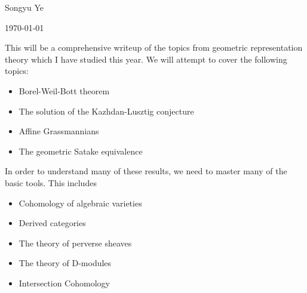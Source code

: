 \documentclass[12pt]{article}
\begin{document}
Songyu Ye

\today

\hfill

This will be a comprehensive writeup of the topics from geometric representation theory which I have studied this year.
We will attempt to cover the following topics:
\begin{itemize}
    \item Borel-Weil-Bott theorem
    \item The solution of the Kazhdan-Lusztig conjecture
    \item Affine Grassmannians
    \item The geometric Satake equivalence
\end{itemize}
In order to understand many of these results, we need to master many of the basic tools. This includes
\begin{itemize}
    \item Cohomology of algebraic varieties
    \item Derived categories
    \item The theory of perverse sheaves
    \item The theory of D-modules
    \item Intersection Cohomology
\end{itemize}
\end{document}
